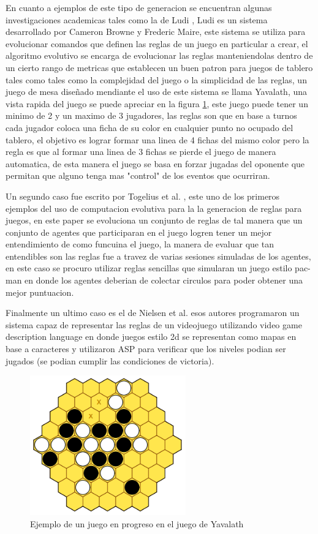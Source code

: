 En cuanto a ejemplos de este tipo de generacion se encuentran algunas
investigaciones academicas tales como la de Ludi \cite{Browne2010}, Ludi es un
sistema desarrollado por Cameron Browne y Frederic Maire, este sistema se
utiliza para evolucionar comandos que definen las reglas de un juego en
particular a crear, el algoritmo evolutivo se encarga de evolucionar las reglas
manteniendolas dentro de un cierto rango de metricas que establecen un buen
patron para juegos de tablero tales como tales como la complejidad del juego o
la simplicidad de las reglas, un juego de mesa diseñado mendiante el uso de este
sistema se llama Yavalath, una vista rapida del juego se puede apreciar en la
figura \ref{figure:Yavalath}, este juego puede tener un minimo de 2 y un maximo
de 3 jugadores, las reglas son que en base a turnos cada jugador coloca una
ficha de su color en cualquier punto no ocupado del tablero, el objetivo es
lograr formar una linea de 4 fichas del mismo color pero la regla es que al
formar una linea de 3 fichas se pierde el juego de manera automatica, de esta
manera el juego se basa en forzar jugadas del oponente que permitan que alguno
tenga mas "control" de los eventos que ocurriran. 

Un segundo caso fue escrito por Togelius et al. \cite{Togelius2008}, este uno de
los primeros ejemplos del uso de computacion evolutiva para la la generacion de
reglas para juegos, en este paper se evoluciona un conjunto de reglas de tal
manera que un conjunto de agentes que participaran en el juego logren tener un
mejor entendimiento de como funcuina el juego, la manera de evaluar que tan
entendibles son las reglas fue a travez de varias sesiones simuladas de los
agentes, en este caso se procuro utilizar reglas sencillas que simularan un
juego estilo pac-man en donde los agentes deberian de colectar circulos para
poder obtener una mejor puntuacion.

Finalmente un ultimo caso es el de Nielsen et al. \cite{Nielsen2015} esos
autores programaron un sistema capaz de representar las reglas de un videojuego
utilizando video game description language en donde juegos estilo 2d se
representan como mapas en base a caracteres y utilizaron ASP para verificar que
los niveles podian ser jugados (se podian cumplir las condiciones de victoria).

\begin{figure}
    \centering
    \includegraphics[width=0.6\textwidth]{img/Yavalath.png}
    \caption{Ejemplo de un juego en progreso en el juego de Yavalath}
    \label{figure:Yavalath}
\end{figure}

